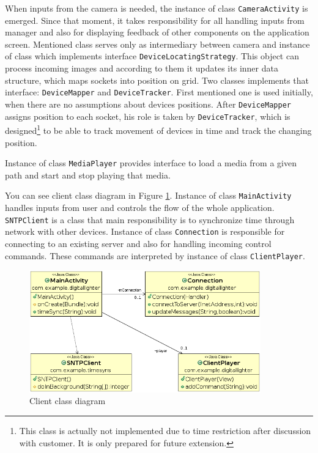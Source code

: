 When inputs from the camera is needed, the instance of class \texttt{CameraActivity} is emerged.
Since that moment, it takes responsibility for all handling inputs from manager and also for displaying feedback of other components on the application screen.
Mentioned class serves only as intermediary between camera and instance of class which implements interface \texttt{DeviceLocatingStrategy}.
This object can process incoming images and according to them it updates its inner data structure, which maps sockets into position on grid.
Two classes implements that interface: \texttt{DeviceMapper} and \texttt{DeviceTracker}.
First mentioned one is used initially, when there are no assumptions about devices positions.
After \texttt{DeviceMapper} assigns position to each socket, his role is taken by \texttt{DeviceTracker}, which is designed\footnote{This class is actually not implemented due to time restriction after discussion with customer. It is only prepared for future extension.} to be able to track movement of devices in time and track the changing position.

Instance of class \texttt{MediaPlayer} provides interface to load a media from a given path and start and stop playing that media.

You can see client class diagram in Figure \ref{fig:architecture_class_diagram_client}.
Instance of class \texttt{MainActivity} handles inputs from user and controls the flow of the whole application.
\texttt{SNTPClient} is a class that main responsibility is to synchronize time through network with other devices.
Instance of class \texttt{Connection} is responsible for connecting to an existing server and also for handling incoming control commands.
These commands are interpreted by instance of class \texttt{ClientPlayer}.

\begin{figure}[!h]
	\centering
		\includegraphics[width=10cm]{softwareArchitecture/class_diagram_client.png}
	\caption{Client class diagram}
	\label{fig:architecture_class_diagram_client}
\end{figure}


